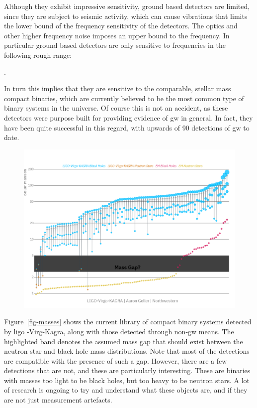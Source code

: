 \documentclass[
  11pt,
  a4paper,
  DIV=11,
  numbers=noendperiod,
  oneside]{scrreprt}
\let\[\relax \let\]\relax %
\DeclareRobustCommand{\[}{\begin{equation}}
\DeclareRobustCommand{\]}{\end{equation}}
\begin{document}
Although they exhibit impressive sensitivity, ground based detectors are
limited, since they are subject to seismic activity, which can cause
vibrations that limits the lower bound of the frequency sensitivity of
the detectors. The optics and other higher frequency noise imposes an
upper bound to the frequency. In particular ground based detectors are
only sensitive to frequencies in the following rough range:

\[
.
\]

In turn this implies that they are sensitive to the comparable, stellar
mass  compact
binaries, which are currently believed to be the most common type of
binary systems in the universe. Of course this is not an accident, as
these detectors were purpose built for providing evidence of \gls{gw} in
general. In fact, they have been quite successful in this regard, with
upwards of 90 detections of \gls{gw} to date.

\begin{figure}


{\centering \includegraphics{./Masses_of_Dead_Stars_LIGO_Virgo_KAGRA.png}

}

\end{figure}

Figure~\ref{fig-masses} shows the current library of compact binary
systems detected by \gls{ligo} -Virg-Kagra, along with those detected
through non-\gls{gw} means. The highlighted band denotes the assumed
mass gap that should exist between the neutron star and black hole mass
distributions. Note that most of the detections are compatible with the
presence of such a gap. However, there are a few detections that are
not, and these are particularly interesting. These are binaries with
masses too light to be black holes, but too heavy to be neutron stars. A
lot of research is ongoing to try and understand what these objects are,
and if they are not just measurement artefacts.
\end{document}
